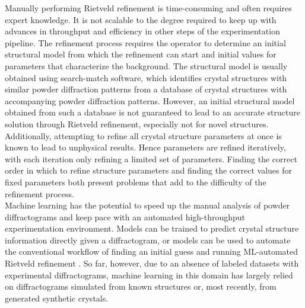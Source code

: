 Manually performing Rietveld refinement is time-consuming and often requires expert knowledge. It is not scalable to the degree required to keep up with advances in throughput and efficiency in other steps of the experimentation pipeline. The refinement process requires the operator to determine an initial structural model from which the refinement can start and initial values for parameters that characterize the background.
The structural model is usually obtained using search-match software, which identifies crystal structures with similar powder diffraction patterns from a database of crystal structures with accompanying powder diffraction patterns. 
However, an initial structural model obtained from such a database is not guaranteed to lead to an accurate structure solution through Rietveld refinement, especially not for novel structures. 
Additionally, attempting to refine all crystal structure parameters at once is known to lead to unphysical results\cite{Ozaki2020}. Hence parameters are refined iteratively, with each iteration only refining a limited set of parameters.%
Finding the correct order in which to refine structure parameters and finding the correct values for fixed parameters both present problems that add to the difficulty of the refinement process.\\

Machine learning has the potential to speed up the manual analysis of powder diffractograms and keep pace with an automated high-throughput experimentation environment\cite{Agrawal2019, Surdu2023}.
Models can be trained to predict crystal structure information directly given a diffractogram, or models can be used to automate the conventional workflow of finding an initial guess \cite{Surdu2023} and running ML-automated Rietveld refinement \cite{Feng2019}.
So far, however, due to an absence of labeled datasets with experimental diffractograms\cite{Wang2020}, machine learning in this domain has largely relied on diffractograms simulated from known structures\cite{Park2017, Lee2023} or, most recently, from generated synthetic crystals\cite{Schopmans2023}. \\

